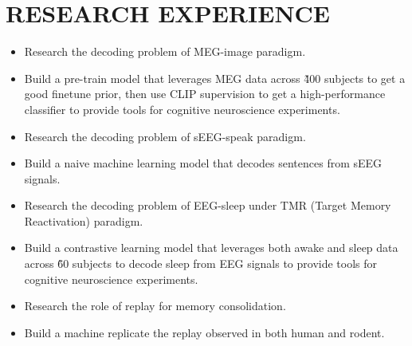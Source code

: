\documentclass{resume}
\begin{document}
\section{{\bfseries RESEARCH EXPERIENCE}}
\begin{itemize}[parsep=0.2ex]
  \item Research the decoding problem of MEG-image paradigm.
  \item Build a pre-train model that leverages MEG data across \~400 subjects to get a good finetune prior, then use CLIP supervision to get a high-performance classifier to provide tools for cognitive neuroscience experiments.
\end{itemize}
\begin{itemize}[parsep=0.2ex]
  \item Research the decoding problem of sEEG-speak paradigm.
  \item Build a naive machine learning model that decodes sentences from sEEG signals.
\end{itemize}
\begin{itemize}[parsep=0.2ex]
  \item Research the decoding problem of EEG-sleep under TMR (Target Memory Reactivation) paradigm.
  \item Build a contrastive learning model that leverages both awake and sleep data across \~60 subjects to decode sleep from EEG signals to provide tools for cognitive neuroscience experiments.
\end{itemize}
\begin{itemize}[parsep=0.2ex]
  \item Research the role of replay for memory consolidation.
  \item Build a machine replicate the replay observed in both human and rodent.
\end{itemize}
\end{document}
